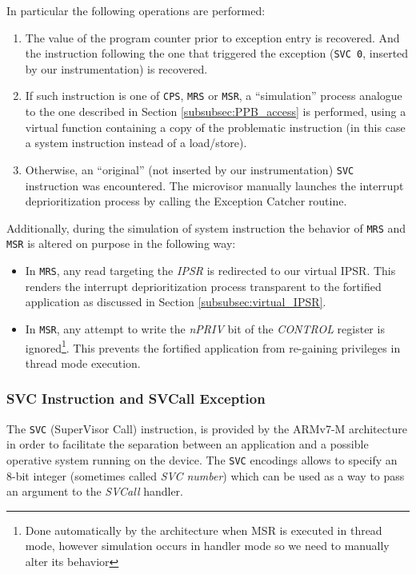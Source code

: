 \documentclass{article}
\begin{document}
In particular the following operations are performed:
\begin{enumerate}
	\item The value of the program counter prior to exception entry is recovered. And the instruction following the one that triggered the exception (\verb|SVC 0|, inserted by our instrumentation) is recovered.
	\item If such instruction is one of \verb|CPS|, \verb|MRS| or \verb|MSR|, a ``simulation'' process analogue to the one described in Section \ref{subsubsec:PPB_access} is performed, using a virtual function containing a copy of the problematic instruction (in this case a system instruction instead of a load/store).
	\item Otherwise, an ``original'' (not inserted by our instrumentation) \verb|SVC| instruction was encountered. The microvisor manually launches the interrupt deprioritization process by calling the Exception Catcher routine.
\end{enumerate}

Additionally, during the simulation of system instruction the behavior of \verb|MRS| and \verb|MSR| is altered on purpose in the following way:
\begin{itemize}
	\item In \verb|MRS|, any read targeting the \textit{IPSR} is redirected to our virtual IPSR. This renders the interrupt deprioritization process transparent to the fortified application as discussed in Section \ref{subsubsec:virtual_IPSR}.
	\item In \verb|MSR|, any attempt to write the \textit{nPRIV} bit of the \textit{CONTROL} register is ignored\footnote{Done automatically by the architecture when MSR is executed in thread mode, however simulation occurs in handler mode so we need to manually alter its behavior}. This prevents the fortified application from re-gaining privileges in thread mode execution.
\end{itemize}

\subsubsection{SVC Instruction and SVCall Exception}
\label{subsubsec:svc}
The \verb|SVC| (SuperVisor Call) instruction, is provided by the ARMv7-M architecture in order to facilitate the separation between an application and a possible operative system running on the device. The \verb|SVC| encodings allows to specify an 8-bit integer (sometimes called \textit{SVC number}) which can be used as a way to pass an argument to the \textit{SVCall} handler.
\end{document}
